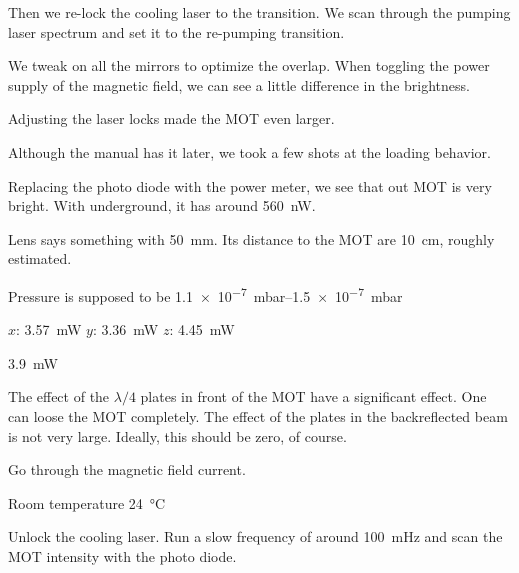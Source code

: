\documentclass[11pt, english, fleqn, DIV=15, headinclude, BCOR=2cm]{scrreprt}
\begin{document}
Then we re-lock the cooling laser to the transition. We scan through the
pumping laser spectrum and set it to the re-pumping transition.

We tweak on all the mirrors to optimize the overlap. When toggling the power
supply of the magnetic field, we can see a little difference in the brightness.


Adjusting the laser locks made the MOT even larger.

Although the manual has it later, we took a few shots at the loading behavior.

Replacing the photo diode with the power meter, we see that out MOT is very
bright. With underground, it has around \SI{560}{\nano\watt}.


Lens says something with \SI{50}{\milli\meter}. Its distance to the MOT are
\SI{10}{\centi\meter}, roughly estimated.

Pressure is supposed to be \SIrange{1.1e-7}{1.5e-7}{\milli\bar}

$x$: \SI{3.57}{\milli\watt}
$y$: \SI{3.36}{\milli\watt}
$z$: \SI{4.45}{\milli\watt}

\SI{3.9}{\milli\watt}

The effect of the $\lambda/4$ plates in front of the MOT have a significant
effect. One can loose the MOT completely. The effect of the plates in the
backreflected beam is not very large. Ideally, this should be zero, of
course.

Go through the magnetic field current.


Room temperature \SI{24}{\celsius}

Unlock the cooling laser. Run a slow frequency of around \SI{100}{\milli\hertz}
and scan the MOT intensity with the photo diode. 
\end{document}
